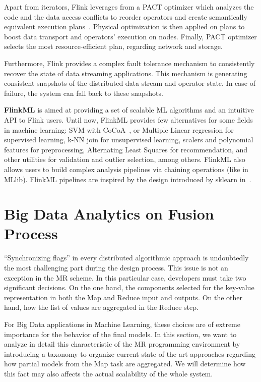 \documentclass[3p,review]{elsarticle}
\begin{document}
Apart from iterators, Flink leverages from a PACT optimizer which analyzes the code and the data access conflicts to reorder operators and create semantically equivalent execution plans~\cite{Alexandrov14,Hues12}. Physical optimization is then applied on plans to boost data transport and operators' execution on nodes. Finally, PACT optimizer selects the most resource-efficient plan, regarding network and storage.

Furthermore, Flink provides a complex fault tolerance mechanism to consistently recover the state of data streaming applications. This mechanism is generating consistent snapshots of the distributed data stream and operator state. In case of failure, the system can fall back to these snapshots.

\textbf{FlinkML} is aimed at providing a set of scalable ML algorithms and an intuitive API to Flink users. Until now, FlinkML provides few alternatives for some fields in machine learning: SVM with CoCoA~\cite{jaggi14}, or Multiple Linear regression for supervised learning, k-NN join for unsupervised learning, scalers and polynomial features for preprocessing, Alternating Least Squares for recommendation, and other utilities for validation and outlier selection, among others. FlinkML also allows users to build complex analysis pipelines via chaining operations (like in MLlib). FlinkML pipelines are inspired by the design introduced by sklearn in~\cite{buitin13}.

\section{Big Data Analytics on Fusion Process}\label{sec:fusion}

``Synchronizing flags'' in every distributed algorithmic approach is undoubtedly the most challenging part during the design process. This issue is not an exception in the MR scheme. In this particular case, developers must take two significant decisions. On the one hand, the components selected for the key-value representation in both the Map and Reduce input and outputs. On the other hand, how the list of values are aggregated in the Reduce step. 

For Big Data applications in Machine Learning, these choices are of extreme importance for the behavior of the final models. In this section, we want to analyze in detail this characteristic of the MR programming environment by introducing a taxonomy to organize current state-of-the-art approaches regarding how partial models from the Map task are aggregated. We will determine how this fact may also affects the actual scalability of the whole system. 
\end{document}

